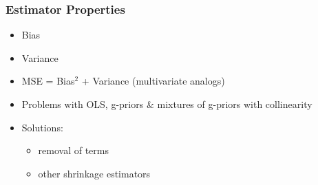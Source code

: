 \documentclass[]{beamer}\usepackage[]{graphicx}\usepackage[]{color}
\begin{document}
\begin{frame}\frametitle{Estimator Properties}

  \begin{itemize}
  \item  Bias  \pause
  \item  Variance \pause
  \item MSE = Bias$^2$ + Variance  (multivariate analogs) \pause
\item Problems with OLS, g-priors \& mixtures of g-priors with collinearity \pause
\item Solutions: \pause
  \begin{itemize}
  \item removal of terms \pause
   \item other shrinkage estimators
  \end{itemize}

  \end{itemize}
\end{frame}
\end{document}
